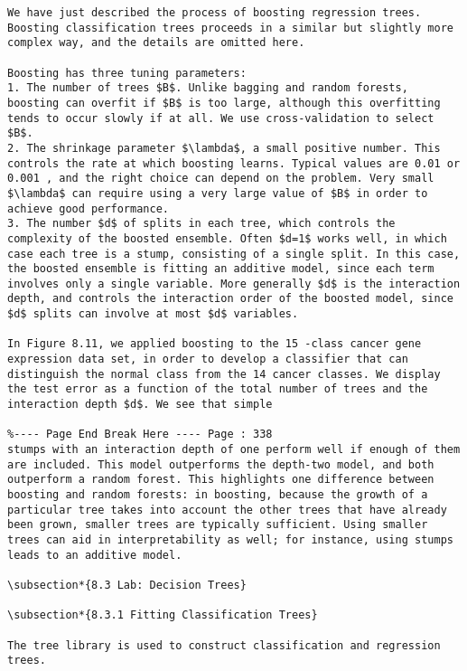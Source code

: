 \documentclass[10pt]{article}
\begin{document}
\begin{verbatim}
We have just described the process of boosting regression trees. Boosting classification trees proceeds in a similar but slightly more complex way, and the details are omitted here.

Boosting has three tuning parameters:
1. The number of trees $B$. Unlike bagging and random forests, boosting can overfit if $B$ is too large, although this overfitting tends to occur slowly if at all. We use cross-validation to select $B$.
2. The shrinkage parameter $\lambda$, a small positive number. This controls the rate at which boosting learns. Typical values are 0.01 or 0.001 , and the right choice can depend on the problem. Very small $\lambda$ can require using a very large value of $B$ in order to achieve good performance.
3. The number $d$ of splits in each tree, which controls the complexity of the boosted ensemble. Often $d=1$ works well, in which case each tree is a stump, consisting of a single split. In this case, the boosted ensemble is fitting an additive model, since each term involves only a single variable. More generally $d$ is the interaction depth, and controls the interaction order of the boosted model, since $d$ splits can involve at most $d$ variables.

In Figure 8.11, we applied boosting to the 15 -class cancer gene expression data set, in order to develop a classifier that can distinguish the normal class from the 14 cancer classes. We display the test error as a function of the total number of trees and the interaction depth $d$. We see that simple

%---- Page End Break Here ---- Page : 338
stumps with an interaction depth of one perform well if enough of them are included. This model outperforms the depth-two model, and both outperform a random forest. This highlights one difference between boosting and random forests: in boosting, because the growth of a particular tree takes into account the other trees that have already been grown, smaller trees are typically sufficient. Using smaller trees can aid in interpretability as well; for instance, using stumps leads to an additive model.

\subsection*{8.3 Lab: Decision Trees}

\subsection*{8.3.1 Fitting Classification Trees}

The tree library is used to construct classification and regression trees.
\end{verbatim}
\end{document}
